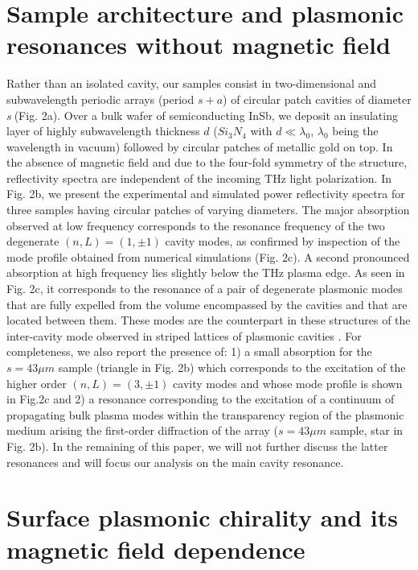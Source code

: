 \documentclass[twocolumn]{article}
\begin{document}
\section*{Sample architecture and plasmonic resonances without magnetic field}
\noindent Rather than an isolated cavity, our samples consist in two-dimensional and subwavelength periodic arrays (period $s+a$) of circular patch cavities of diameter $s\ $(Fig. 2a). Over a bulk wafer of semiconducting InSb, we deposit an insulating layer of highly subwavelength thickness $d$ (${Si}_{3}{N}_{4}$ with $d\ll \lambda_0 $, $\lambda_0 $ being the wavelength in vacuum) followed by circular patches of metallic gold on top. In the absence of magnetic field and due to the four-fold symmetry of the structure, reflectivity spectra are independent of the incoming THz light polarization.  In Fig. 2b, we present the experimental and simulated power reflectivity spectra for three samples having circular patches of varying diameters. The major absorption observed at low frequency corresponds to the resonance frequency of the two degenerate $(n,L)=(1,\pm 1)$ cavity modes, as confirmed by inspection of the mode profile obtained from numerical simulations (Fig.  2c). A second pronounced absorption at high frequency lies slightly below the THz plasma edge. As seen in Fig. 2c, it corresponds to the resonance of a pair of degenerate plasmonic modes that are fully expelled from the volume encompassed by the cavities and that are located between them. These modes are the counterpart in these structures of the inter-cavity mode observed in striped lattices of plasmonic cavities \cite{Aupiais_2023}. For completeness, we also report the presence of: 1) a small absorption for the $s=43\mu m$ sample (triangle in Fig. 2b) which corresponds to the excitation of the higher order $(n,L)=(3,\pm 1)$ cavity modes and whose mode profile is shown in Fig.2c and 2) a resonance corresponding to the excitation of a continuum of propagating bulk plasma modes within the transparency region of the plasmonic medium arising the first-order diffraction of the array ($s=43\mu m$ sample, star in Fig. 2b). In the remaining of this paper, we will not further discuss the latter resonances and will focus our analysis on the main cavity resonance. 

\section*{Surface plasmonic chirality and its magnetic field dependence}
\end{document}
